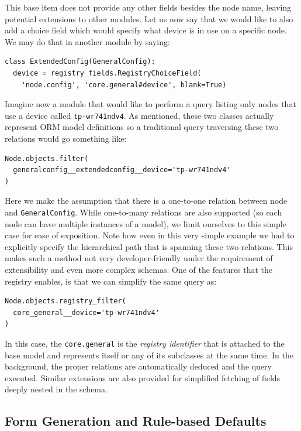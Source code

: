 \documentclass[5p,sort&compress]{elsarticle}
\begin{document}
This base item does not provide any other fields besides the node name, leaving potential extensions to other modules.
Let us now say that we would like to also add a choice field which would specify what device is in use on a specific node. We may do that in another module by saying:
\begin{verbatim}
class ExtendedConfig(GeneralConfig):
  device = registry_fields.RegistryChoiceField(
    'node.config', 'core.general#device', blank=True)
\end{verbatim}

Imagine now a module that would like to perform a query listing only nodes that use a device called \texttt{tp-wr741ndv4}.
As mentioned, these two classes actually represent ORM model definitions so a traditional query traversing these two relations would go something like:
\begin{verbatim}
Node.objects.filter(
  generalconfig__extendedconfig__device='tp-wr741ndv4'
)
\end{verbatim}

Here we make the assumption that there is a one-to-one relation between node and \texttt{GeneralConfig}.
While one-to-many relations are also supported (so each node can have multiple instances of a model), we limit ourselves to this simple case for ease of exposition.
Note how even in this very simple example we had to explicitly specify the hierarchical path that is spanning these two relations.
This makes such a method not very developer-friendly under the requirement of extensibility and even more complex schemas.
One of the features that the registry enables, is that we can simplify the same query as:
\begin{verbatim}
Node.objects.registry_filter(
  core_general__device='tp-wr741ndv4'
)
\end{verbatim}

In this case, the \texttt{core.general} is the \textit{registry identifier} that is attached to the base model and represents itself or any of its subclasses at the same time.
In the background, the proper relations are automatically deduced and the query executed.
Similar extensions are also provided for simplified fetching of fields deeply nested in the schema.

\subsection{Form Generation and Rule-based Defaults}
\end{document}
